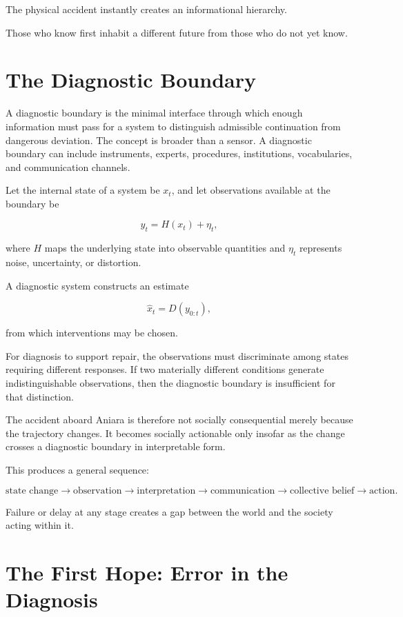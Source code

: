 \documentclass[11pt,oneside]{book}
\theoremstyle{definition}
\theoremstyle{remark}
\begin{document}
The physical accident instantly creates an informational hierarchy.

Those who know first inhabit a different future from those who do not yet know.

\section{The Diagnostic Boundary}

A diagnostic boundary is the minimal interface through which enough information must pass for a system to distinguish admissible continuation from dangerous deviation. The concept is broader than a sensor. A diagnostic boundary can include instruments, experts, procedures, institutions, vocabularies, and communication channels.

Let the internal state of a system be \(x_t\), and let observations available at the boundary be

\[
y_t
=
H(x_t)+\eta_t,
\]

where \(H\) maps the underlying state into observable quantities and \(\eta_t\) represents noise, uncertainty, or distortion.

A diagnostic system constructs an estimate

\[
\hat x_t
=
D(y_{0:t}),
\]

from which interventions may be chosen.

For diagnosis to support repair, the observations must discriminate among states requiring different responses. If two materially different conditions generate indistinguishable observations, then the diagnostic boundary is insufficient for that distinction.

The accident aboard Aniara is therefore not socially consequential merely because the trajectory changes. It becomes socially actionable only insofar as the change crosses a diagnostic boundary in interpretable form.

This produces a general sequence:

\[
\text{state change}
\rightarrow
\text{observation}
\rightarrow
\text{interpretation}
\rightarrow
\text{communication}
\rightarrow
\text{collective belief}
\rightarrow
\text{action}.
\]

Failure or delay at any stage creates a gap between the world and the society acting within it.

\section{The First Hope: Error in the Diagnosis}
\end{document}
